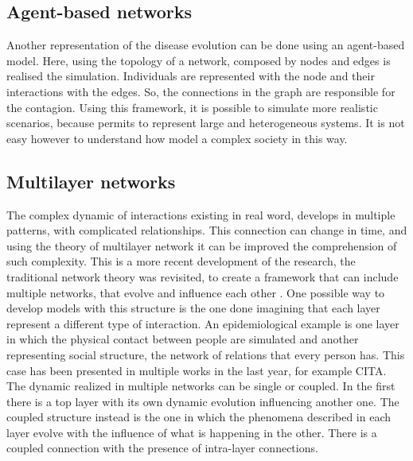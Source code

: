 \subsection{Agent-based networks}
Another representation of the disease evolution can be done using an agent-based model. Here, using the topology of a network, composed by nodes and edges is realised the simulation. Individuals are represented with the node and their interactions with the edges. So, the connections in the graph are responsible for the contagion. Using this framework, it is possible to simulate more realistic scenarios, because permits to represent large and heterogeneous systems. It is not easy however to understand how model a complex society in this way.  

\subsection{Multilayer networks}

The complex dynamic of interactions existing in real word, develops in multiple patterns, with complicated relationships. This connection can change in time, and using the theory of multilayer network it can be improved the comprehension of such complexity. This is a more recent development of the research, the traditional network theory was revisited, to create a framework that can include multiple networks, that evolve and influence each other \cite{DeDomenico2016}. 
One possible way to develop models with this structure is the one done imagining that each layer represent a different type of interaction. An epidemiological example is one layer in which the physical contact between people are simulated and another representing social structure, the network of relations that every person has. This case has been presented in multiple works in the last year, for example CITA. 
The dynamic realized in multiple networks can be single or coupled. In the first there is a top layer with its own dynamic evolution influencing another one. The coupled structure instead is the one in which the phenomena described in each layer evolve with the influence of what is happening in the other. There is a coupled connection with the presence of intra-layer connections.




